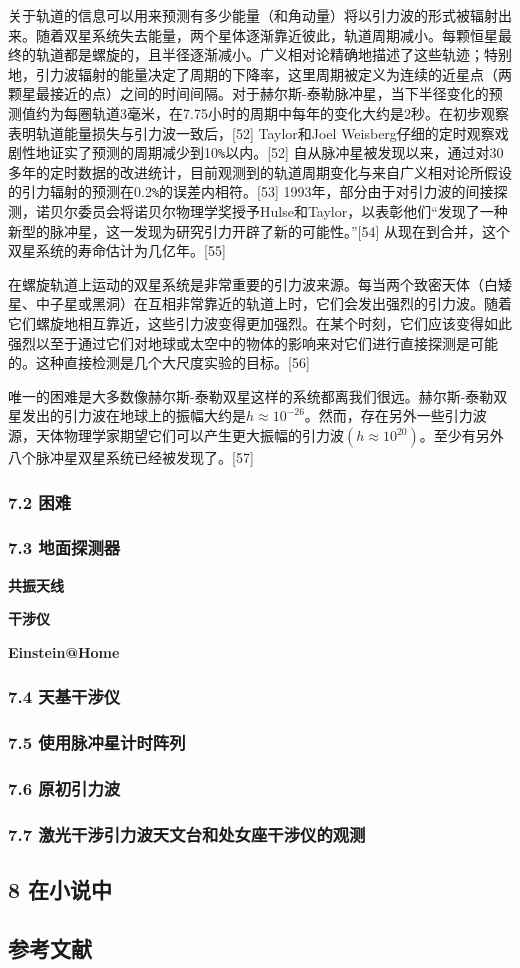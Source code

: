 关于轨道的信息可以用来预测有多少能量（和角动量）将以引力波的形式被辐射出来。随着双星系统失去能量，两个星体逐渐靠近彼此，轨道周期减小。每颗恒星最终的轨道都是螺旋的，且半径逐渐减小。广义相对论精确地描述了这些轨迹；特别地，引力波辐射的能量决定了周期的下降率，这里周期被定义为连续的近星点（两颗星最接近的点）之间的时间间隔。对于赫尔斯-泰勒脉冲星，当下半径变化的预测值约为每圈轨道3毫米，在7.75小时的周期中每年的变化大约是2秒。在初步观察表明轨道能量损失与引力波一致后，[52] Taylor和Joel Weisberg仔细的定时观察戏剧性地证实了预测的周期减少到10\verb|%|以内。[52] 自从脉冲星被发现以来，通过对30多年的定时数据的改进统计，目前观测到的轨道周期变化与来自广义相对论所假设的引力辐射的预测在0.2\verb|%|的误差内相符。[53] 1993年，部分由于对引力波的间接探测，诺贝尔委员会将诺贝尔物理学奖授予Hulse和Taylor，以表彰他们“发现了一种新型的脉冲星，这一发现为研究引力开辟了新的可能性。”[54] 从现在到合并，这个双星系统的寿命估计为几亿年。[55]

在螺旋轨道上运动的双星系统是非常重要的引力波来源。每当两个致密天体（白矮星、中子星或黑洞）在互相非常靠近的轨道上时，它们会发出强烈的引力波。随着它们螺旋地相互靠近，这些引力波变得更加强烈。在某个时刻，它们应该变得如此强烈以至于通过它们对地球或太空中的物体的影响来对它们进行直接探测是可能的。这种直接检测是几个大尺度实验的目标。[56]

唯一的困难是大多数像赫尔斯-泰勒双星这样的系统都离我们很远。赫尔斯-泰勒双星发出的引力波在地球上的振幅大约是$h\approx  10^{-26}$。然而，存在另外一些引力波源，天体物理学家期望它们可以产生更大振幅的引力波$(h \approx 10^{20})$。至少有另外八个脉冲星双星系统已经被发现了。[57]

\subsubsection{7.2 困难}

\subsubsection{7.3 地面探测器}

\textbf{共振天线}

\textbf{干涉仪}

\textbf{Einstein@Home}

\subsubsection{7.4 天基干涉仪}

\subsubsection{7.5 使用脉冲星计时阵列}

\subsubsection{7.6 原初引力波}

\subsubsection{7.7 激光干涉引力波天文台和处女座干涉仪的观测}

\subsection{8 在小说中}

\subsection{参考文献}
